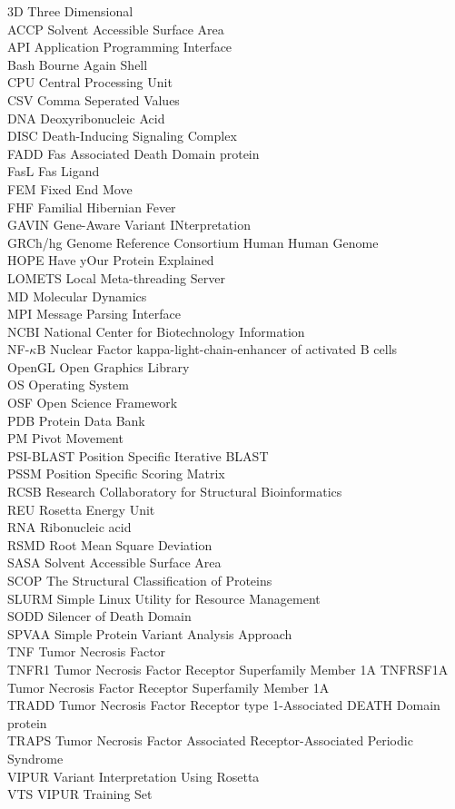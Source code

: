 3D Three Dimensional\\
ACCP Solvent Accessible Surface Area\\
API Application Programming Interface\\
Bash Bourne Again Shell\\
CPU Central Processing Unit\\
CSV Comma Seperated Values\\
DNA Deoxyribonucleic Acid\\
DISC Death-Inducing Signaling Complex\\
FADD Fas Associated Death Domain protein\\
FasL Fas Ligand\\
FEM Fixed End Move\\
FHF Familial Hibernian Fever\\
GAVIN Gene-Aware Variant INterpretation\\
GRCh/hg Genome Reference Consortium Human Human Genome\\
HOPE Have yOur Protein Explained\\
LOMETS Local Meta-threading Server\\
MD	Molecular Dynamics\\
MPI Message Parsing Interface\\
NCBI National Center for Biotechnology Information\\
NF-$\kappa$B Nuclear Factor kappa-light-chain-enhancer of activated B cells\\
OpenGL Open Graphics Library\\
OS Operating System\\
OSF Open Science Framework\\
PDB Protein Data Bank\\
PM Pivot Movement\\
PSI-BLAST Position Specific Iterative BLAST\\
PSSM Position Specific Scoring Matrix\\
RCSB Research Collaboratory for Structural Bioinformatics\\
REU Rosetta Energy Unit\\
RNA Ribonucleic acid\\
RSMD Root Mean Square Deviation\\
SASA Solvent Accessible Surface Area\\
SCOP The Structural Classification of Proteins\\
SLURM Simple Linux Utility for Resource Management\\
SODD Silencer of Death Domain\\
SPVAA Simple Protein Variant Analysis Approach\\
TNF Tumor Necrosis Factor\\
TNFR1 Tumor Necrosis Factor Receptor Superfamily Member 1A
TNFRSF1A Tumor Necrosis Factor Receptor Superfamily Member 1A\\
TRADD Tumor Necrosis Factor Receptor type 1-Associated DEATH Domain protein\\
TRAPS Tumor Necrosis Factor Associated Receptor-Associated Periodic Syndrome\\
VIPUR Variant Interpretation Using Rosetta\\
VTS VIPUR Training Set\\